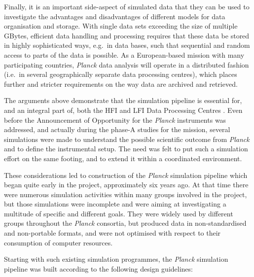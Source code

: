 \documentclass{aa}
\begin{document}
Finally, it is an important side-aspect of simulated data that they
can be used to investigate the advantages and disadvantages of
different models for data organisation and storage. With single data
sets exceeding the size of multiple GBytes, efficient data handling
and processing requires that these data be stored in highly
sophisticated ways, e.g.~in data bases, such that sequential and random
access to parts of the data is possible. As a European-based mission
with many participating countries, \emph{Planck} data analysis will
operate in a distributed fashion (i.e.\ in several geographically separate
data processing centres), which places further and stricter
requirements on the way data are archived and retrieved.

The arguments above demonstrate that the simulation pipeline is
essential for, and an integral part of, both the HFI and LFI Data Processing
Centres \citep{pasian-sygnet-2002}.
Even before the Announcement of Opportunity for the \emph{Planck} instruments
was addressed, and actually during the phase-A studies for the mission,
several simulations were made to understand the possible scientific outcome
from \emph{Planck} and to define the instrumental setup. The need was felt
to put such a simulation effort on the same footing, and to extend it within a
coordinated environment.

These considerations led to construction of the \emph{Planck}
simulation pipeline which began quite early in the
project, approximately six years ago. At that time there were numerous
simulation activities within many groups involved in the project,
but those simulations were incomplete and were aiming at investigating a
multitude of specific and different goals. They were widely used by different
groups throughout the \emph{Planck} consortia, but produced
data in non-standardised and non-portable formats, and were not
optimised with respect to their consumption of computer resources.

Starting with such existing simulation programmes, the \emph{Planck}
simulation pipeline was built according to the following design
guidelines:
\end{document}
